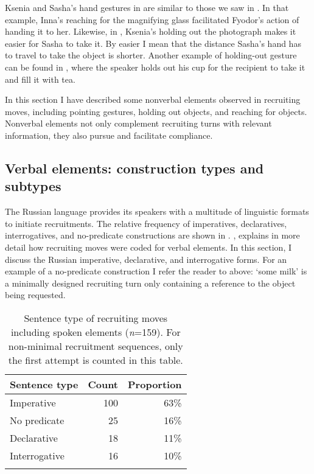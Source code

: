 \documentclass[output=paper,modfonts,nonflat]{langsci/langscibook}
\begin{document}
Ksenia and Sasha’s hand gestures in  are similar to those we saw in . In that example, Inna’s reaching for the magnifying glass facilitated Fyodor’s action of handing it to her. Likewise, in , Ksenia’s holding out the photograph makes it easier for Sasha to take it. By easier I mean that the distance Sasha’s hand has to travel to take the object is shorter. Another example of holding-out gesture can be found in , where the speaker holds out his cup for the recipient to take it and fill it with tea.

In this section I have described some nonverbal elements observed in recruiting moves, including pointing gestures, holding out objects, and reaching for objects. Nonverbal elements not only complement recruiting turns with relevant information, they also pursue and facilitate compliance.

\subsection{Verbal elements: construction types and subtypes}\label{sec:baranova:3.3}

The Russian language provides its speakers with a multitude of linguistic formats to initiate recruitments. The relative frequency of imperatives, declaratives, interrogatives, and no-predicate constructions are shown in . ,  explains in more detail how recruiting moves were coded for verbal elements. In this section, I discuss the Russian imperative, declarative, and interrogative forms. For an example of a no-predicate construction I refer the reader to  above: ‘some milk’ is a minimally designed recruiting turn only containing a reference to the object being requested.

\begin{table}
\begin{tabularx}{.66\textwidth}{Xrr}
\lsptoprule
Sentence type & Count & Proportion\\
\midrule
Imperative & 100 & 63\%\\
No predicate & 25 & 16\%\\
Declarative & 18 & 11\%\\
Interrogative & 16 & 10\%\\
\lspbottomrule
\end{tabularx}
\caption{Sentence type of recruiting moves including spoken elements (\textit{n}=159). For non-minimal recruitment sequences, only the first attempt is counted in this table.}
\label{tab:baranova:3}
\end{table}
\end{document}
